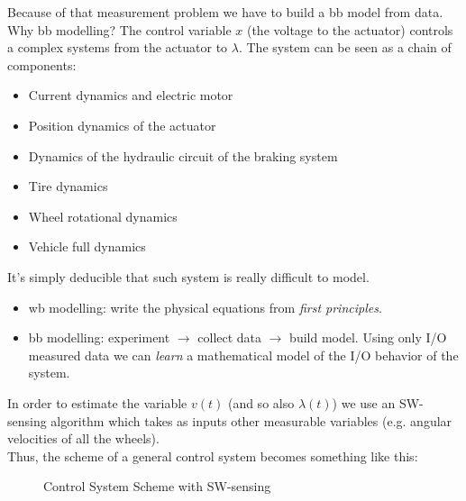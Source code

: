 Because of that measurement problem we have to build a \acrlong{bb} model from data.\\

Why \acrlong{bb} modelling?
The control variable $x$ (the voltage to the actuator) controls a complex systems from the actuator to $\lambda$.
The system can be seen as a chain of components:
\begin{itemize}
    \item Current dynamics and electric motor
    \item Position dynamics of the actuator
    \item Dynamics of the hydraulic circuit of the braking system
    \item Tire dynamics
    \item Wheel rotational dynamics
    \item Vehicle full dynamics
\end{itemize}

It's simply deducible that such system is really difficult to model.

\begin{rem}
    \hfill \break
    \begin{itemize}
	   \item \gls{wb} modelling: write the physical equations from \emph{first principles}.
	   \item \gls{bb} modelling: experiment $\rightarrow$ collect data $\rightarrow$ build model.
        Using only I/O measured data we can \emph{learn} a mathematical model of the I/O behavior of the system.
    \end{itemize}
\end{rem}

In order to estimate the variable $v(t)$ (and so also $\lambda(t)$) we use an SW-sensing algorithm which takes as inputs other measurable variables (e.g. angular velocities of all the wheels). \\
Thus, the scheme of a general control system becomes something like this: 

\begin{figure}[H]
    \centering
    \vspace{5pt}
	\caption*{Control System Scheme with SW-sensing}
\end{figure}

